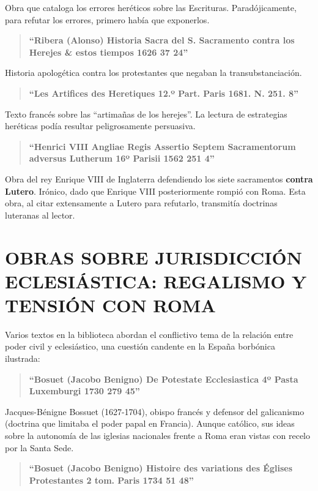 \documentclass[12pt,a4paper]{article}
\begin{document}
Obra que cataloga los errores heréticos sobre las Escrituras. Paradójicamente, para refutar los errores, primero había que exponerlos.

\begin{quote}
\textbf{``Ribera (Alonso) Historia Sacra del S. Sacramento contra los Herejes \& estos tiempos 1626 37 24''}
\end{quote}

Historia apologética contra los protestantes que negaban la transubstanciación.

\begin{quote}
\textbf{``Les Artifices des Heretiques 12.º Part. Paris 1681. N. 251. 8''}
\end{quote}

Texto francés sobre las ``artimañas de los herejes''. La lectura de estrategias heréticas podía resultar peligrosamente persuasiva.

\begin{quote}
\textbf{``Henrici VIII Angliae Regis Assertio Septem Sacramentorum adversus Lutherum 16º Parisii 1562 251 4''}
\end{quote}

Obra del rey Enrique VIII de Inglaterra defendiendo los siete sacramentos \textbf{contra Lutero}. Irónico, dado que Enrique VIII posteriormente rompió con Roma. Esta obra, al citar extensamente a Lutero para refutarlo, transmitía doctrinas luteranas al lector.

\section{OBRAS SOBRE JURISDICCIÓN ECLESIÁSTICA: REGALISMO Y TENSIÓN CON ROMA}

Varios textos en la biblioteca abordan el conflictivo tema de la relación entre poder civil y eclesiástico, una cuestión candente en la España borbónica ilustrada:

\begin{quote}
\textbf{``Bosuet (Jacobo Benigno) De Potestate Ecclesiastica 4º Pasta Luxemburgi 1730 279 45''}
\end{quote}

Jacques-Bénigne Bossuet (1627-1704), obispo francés y defensor del galicanismo (doctrina que limitaba el poder papal en Francia). Aunque católico, sus ideas sobre la autonomía de las iglesias nacionales frente a Roma eran vistas con recelo por la Santa Sede.

\begin{quote}
\textbf{``Bosuet (Jacobo Benigno) Histoire des variations des Églises Protestantes 2 tom. Paris 1734 51 48''}
\end{quote}
\end{document}
